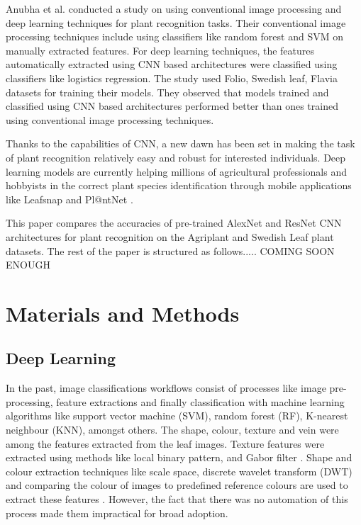 \documentclass[conference]{IEEEtran}
\begin{document}
Anubha et al. \cite{anubha2019study} conducted a study on using conventional image processing and deep learning techniques for plant recognition tasks. Their conventional image processing techniques include using classifiers like random forest and SVM on manually extracted features. For deep learning techniques, the features automatically extracted using CNN based architectures were classified using classifiers like logistics regression. The study used Folio, Swedish leaf, Flavia datasets for training their models. They observed that models trained and classified using CNN based architectures performed better than ones trained using conventional image processing techniques.

Thanks to the capabilities of CNN, a new dawn has been set in making the task of plant recognition relatively easy and robust for interested individuals. Deep learning models are currently helping millions of agricultural professionals and hobbyists in the correct plant species identification through mobile applications like Leafsnap and Pl@ntNet \cite{kumar2012leafsnap, plantnet_team}.

This paper compares the accuracies of pre-trained AlexNet and ResNet CNN architectures for plant recognition on the Agriplant and Swedish Leaf plant datasets. The rest of the paper is structured as follows..... COMING SOON ENOUGH





\section{Materials and Methods}


\subsection{Deep Learning}\label{AA}

In the past, image classifications workflows consist of processes like image pre-processing, feature extractions and finally classification with machine learning algorithms like support vector machine (SVM), random forest (RF), K-nearest neighbour (KNN), amongst others. The shape, colour, texture and vein were among the features extracted from the leaf images. Texture features were extracted using methods like local binary pattern, and Gabor filter  \cite{guo2010completed, li2010selection}. Shape and colour extraction techniques like scale space, discrete wavelet transform (DWT) and comparing the colour of images to predefined reference colours are used to extract these features \cite{satpute2016color}. However, the fact that there was no automation of this process made them impractical for broad adoption.
\end{document}
